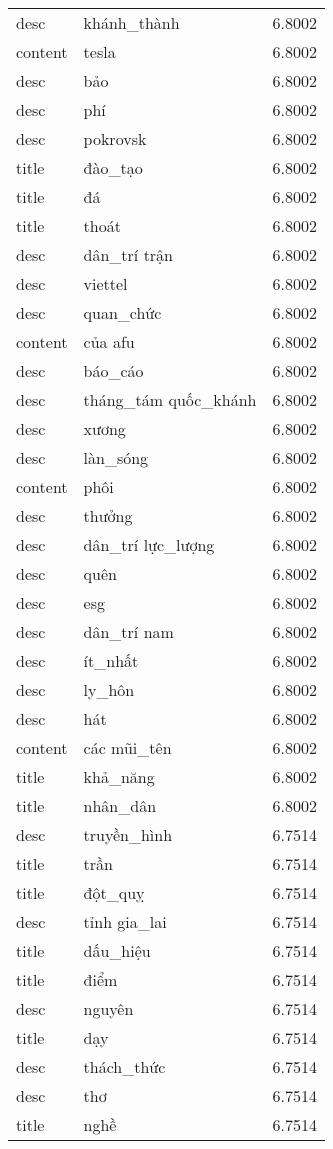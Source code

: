 \documentclass{article}
\begin{document}
\begin{tabular}{lll}
desc & khánh\_thành & 6.8002\\
content & tesla & 6.8002\\
desc & bảo & 6.8002\\
desc & phí & 6.8002\\
desc & pokrovsk & 6.8002\\
title & đào\_tạo & 6.8002\\
title & đá & 6.8002\\
title & thoát & 6.8002\\
desc & dân\_trí trận & 6.8002\\
desc & viettel & 6.8002\\
desc & quan\_chức & 6.8002\\
content & của afu & 6.8002\\
desc & báo\_cáo & 6.8002\\
desc & tháng\_tám quốc\_khánh & 6.8002\\
desc & xương & 6.8002\\
desc & làn\_sóng & 6.8002\\
content & phôi & 6.8002\\
desc & thưởng & 6.8002\\
desc & dân\_trí lực\_lượng & 6.8002\\
desc & quên & 6.8002\\
desc & esg & 6.8002\\
desc & dân\_trí nam & 6.8002\\
desc & ít\_nhất & 6.8002\\
desc & ly\_hôn & 6.8002\\
desc & hát & 6.8002\\
content & các mũi\_tên & 6.8002\\
title & khả\_năng & 6.8002\\
title & nhân\_dân & 6.8002\\
desc & truyền\_hình & 6.7514\\
title & trần & 6.7514\\
title & đột\_quỵ & 6.7514\\
desc & tỉnh gia\_lai & 6.7514\\
title & dấu\_hiệu & 6.7514\\
title & điểm & 6.7514\\
desc & nguyên & 6.7514\\
title & dạy & 6.7514\\
desc & thách\_thức & 6.7514\\
desc & thơ & 6.7514\\
title & nghề & 6.7514\\

\end{tabular}
\end{document}
